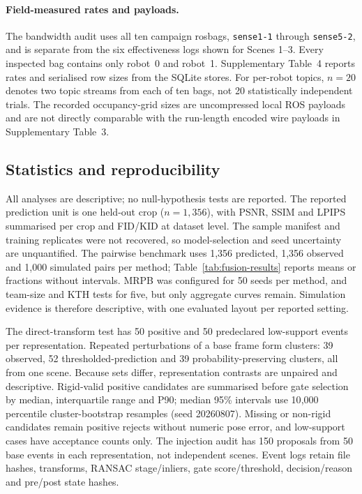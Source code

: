 \documentclass[11pt]{article}
\begin{document}
\paragraph{Field-measured rates and payloads.}
The bandwidth audit uses all ten campaign rosbags, \texttt{sense1-1} through \texttt{sense5-2}, and is separate from the six effectiveness logs shown for Scenes 1--3. Every inspected bag contains only robot~0 and robot~1. Supplementary Table~4 reports rates and serialised row sizes from the SQLite stores. For per-robot topics, $n{=}20$ denotes two topic streams from each of ten bags, not 20 statistically independent trials. The recorded occupancy-grid sizes are uncompressed local ROS payloads and are not directly comparable with the run-length encoded wire payloads in Supplementary Table~3.

\subsection{Statistics and reproducibility}
All analyses are descriptive; no null-hypothesis tests are reported. The reported prediction unit is one held-out crop ($n{=}1{,}356$), with PSNR, SSIM and LPIPS summarised per crop and FID/KID at dataset level. The sample manifest and training replicates were not recovered, so model-selection and seed uncertainty are unquantified. The pairwise benchmark uses 1{,}356 predicted, 1{,}356 observed and 1{,}000 simulated pairs per method; Table~\ref{tab:fusion-results} reports means or fractions without intervals. MRPB was configured for 50 seeds per method, and team-size and KTH tests for five, but only aggregate curves remain. Simulation evidence is therefore descriptive, with one evaluated layout per reported setting.

The direct-transform test has 50 positive and 50 predeclared low-support events per representation. Repeated perturbations of a base frame form clusters: 39 observed, 52 thresholded-prediction and 39 probability-preserving clusters, all from one scene. Because sets differ, representation contrasts are unpaired and descriptive. Rigid-valid positive candidates are summarised before gate selection by median, interquartile range and P90; median 95\% intervals use 10{,}000 percentile cluster-bootstrap resamples (seed 20260807). Missing or non-rigid candidates remain positive rejects without numeric pose error, and low-support cases have acceptance counts only. The injection audit has 150 proposals from 50 base events in each representation, not independent scenes. Event logs retain file hashes, transforms, RANSAC stage/inliers, gate score/threshold, decision/reason and pre/post state hashes.
\end{document}
